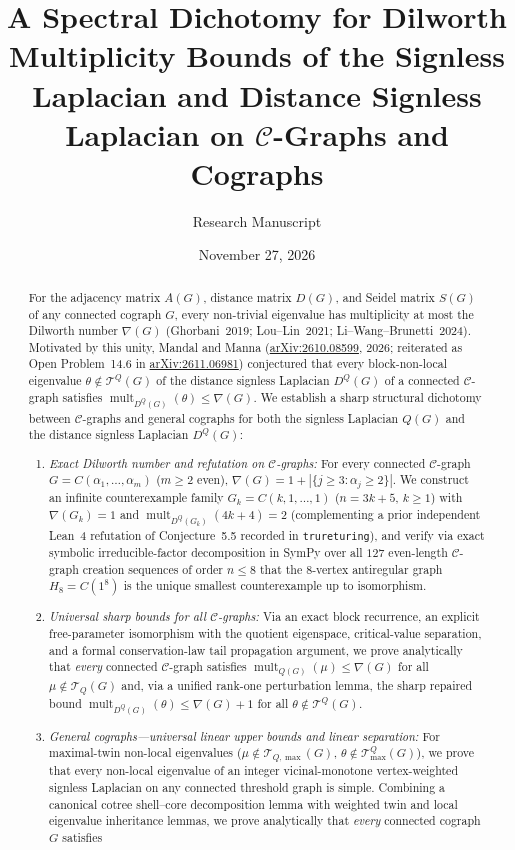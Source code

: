 \documentclass[11pt,a4paper]{article}
\title{\Large\textbf{A Spectral Dichotomy for Dilworth Multiplicity Bounds of the Signless Laplacian and Distance Signless Laplacian on $\mathcal{C}$-Graphs and Cographs}}
\author{Research Manuscript}
\date{November 27, 2026}
\theoremstyle{definition}
\DeclareMathOperator{\mult}{mult}
\begin{document}
\maketitle
\thispagestyle{plain}

\begin{abstract}
\noindent
For the adjacency matrix $A(G)$, distance matrix $D(G)$, and Seidel matrix $S(G)$ of any connected cograph $G$, every non-trivial eigenvalue has multiplicity at most the Dilworth number $\nabla(G)$ (Ghorbani~2019; Lou--Lin~2021; Li--Wang--Brunetti~2024). Motivated by this unity, Mandal and Manna (\href{https://arxiv.org/abs/2610.08599}{arXiv:2610.08599}, 2026; reiterated as Open Problem~14.6 in \href{https://arxiv.org/abs/2611.06981}{arXiv:2611.06981}) conjectured that every block-non-local eigenvalue $\theta \notin \mathcal{T}^Q(G)$ of the distance signless Laplacian $D^Q(G)$ of a connected $\mathcal{C}$-graph satisfies $\mult_{D^Q(G)}(\theta) \le \nabla(G)$. We establish a sharp structural dichotomy between $\mathcal{C}$-graphs and general cographs for both the signless Laplacian $Q(G)$ and the distance signless Laplacian $D^Q(G)$:
\begin{enumerate}
  \item[(i)] \emph{Exact Dilworth number and refutation on $\mathcal{C}$-graphs:} For every connected $\mathcal{C}$-graph $G = C(\alpha_1,\dots,\alpha_m)$ ($m \ge 2$ even), $\nabla(G) = 1 + |\{j \ge 3 : \alpha_j \ge 2\}|$. We construct an infinite counterexample family $G_k = C(k,1,\dots,1)$ ($n = 3k+5$, $k \ge 1$) with $\nabla(G_k)=1$ and $\mult_{D^Q(G_k)}(4k+4) = 2$ (complementing a prior independent Lean~4 refutation of Conjecture~5.5 recorded in \texttt{trureturing}), and verify via exact symbolic irreducible-factor decomposition in SymPy over all $127$ even-length $\mathcal{C}$-graph creation sequences of order $n \le 8$ that the $8$-vertex antiregular graph $H_8 = C(1^8)$ is the unique smallest counterexample up to isomorphism.
  \item[(ii)] \emph{Universal sharp bounds for all $\mathcal{C}$-graphs:} Via an exact block recurrence, an explicit free-parameter isomorphism with the quotient eigenspace, critical-value separation, and a formal conservation-law tail propagation argument, we prove analytically that \emph{every} connected $\mathcal{C}$-graph satisfies $\mult_{Q(G)}(\mu) \le \nabla(G)$ for all $\mu \notin \mathcal{T}_Q(G)$ and, via a unified rank-one perturbation lemma, the sharp repaired bound $\mult_{D^Q(G)}(\theta) \le \nabla(G) + 1$ for all $\theta \notin \mathcal{T}^Q(G)$.
  \item[(iii)] \emph{General cographs—universal linear upper bounds and linear separation:} For maximal-twin non-local eigenvalues ($\mu \notin \mathcal{T}_{Q,\max}(G)$, $\theta \notin \mathcal{T}^Q_{\max}(G)$), we prove that every non-local eigenvalue of an integer vicinal-monotone vertex-weighted signless Laplacian on any connected threshold graph is simple. Combining a canonical cotree shell--core decomposition lemma with weighted twin and local eigenvalue inheritance lemmas, we prove analytically that \emph{every} connected cograph $G$ satisfies

\end{enumerate}
\end{abstract}
\end{document}
